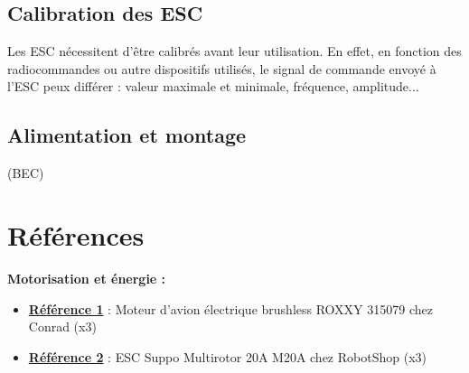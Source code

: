 \documentclass[a4paper,11pt]{report}
\begin{document}
				\newpage\section{Calibration des ESC}
				
				Les ESC nécessitent d'être calibrés avant leur utilisation. En effet, en fonction des radiocommandes ou autre dispositifs utilisés, le signal de commande envoyé à l'ESC peux différer : valeur maximale et minimale, fréquence, amplitude... 
				
				\section{Alimentation et montage}
				(BEC)
				
				
\chapter{Références}

				\textbf{Motorisation et énergie :}
				\begin{itemize}
							\item \textbf{\href{http://www.conrad.fr/ce/fr/product/231891/Moteur-davion-lectrique-brushless-ROXXY-315079?ref=searchDetail}{Référence 1}} : Moteur d'avion électrique brushless ROXXY 315079 chez Conrad (x3)
							\item \textbf{\href{https://www.robotshop.com/eu/fr/esc-multirotor-20a-m20a.html}{Référence 2}} : ESC Suppo Multirotor 20A M20A chez RobotShop (x3)
										
				\end{itemize}
\end{document}
